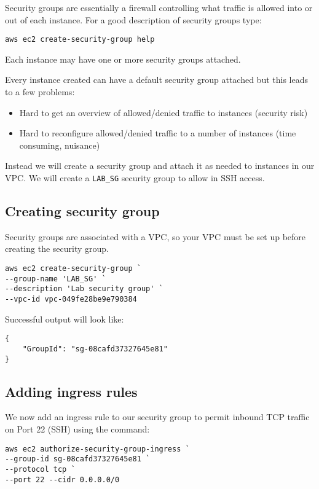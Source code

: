 \documentclass{pgnotes}
\begin{document}
Security groups are essentially a firewall controlling what traffic is allowed into or out of each instance.
For a good description of security groups type:
\begin{verbatim}
aws ec2 create-security-group help
\end{verbatim}

Each instance may have one or more security groups attached.

Every instance created can have a default security group attached but this leads to a few problems:
\begin{itemize}
\item Hard to get an overview of allowed/denied traffic to instances (security risk)
\item Hard to reconfigure allowed/denied traffic to a number of instances (time consuming, nuisance)
\end{itemize}
Instead we will create a security group and attach it as needed to instances in our VPC.
We will create a \texttt{LAB\_SG} security group to allow in SSH access.

\subsection{Creating security group}
\label{sec:creating-security-group}

Security groups are associated with a VPC, so your VPC must be set up before creating the security group. 
\begin{verbatim}
aws ec2 create-security-group `
--group-name 'LAB_SG' `
--description 'Lab security group' `
--vpc-id vpc-049fe28be9e790384
\end{verbatim}
Successful output will look like:
\begin{verbatim}
{
    "GroupId": "sg-08cafd37327645e81"
}
\end{verbatim}

\subsection{Adding ingress rules}

We now add an ingress rule to our security group to permit inbound TCP traffic on Port 22 (SSH) using the command: 

\begin{verbatim}
aws ec2 authorize-security-group-ingress `
--group-id sg-08cafd37327645e81 `
--protocol tcp `
--port 22 --cidr 0.0.0.0/0
\end{verbatim}
\end{document}
